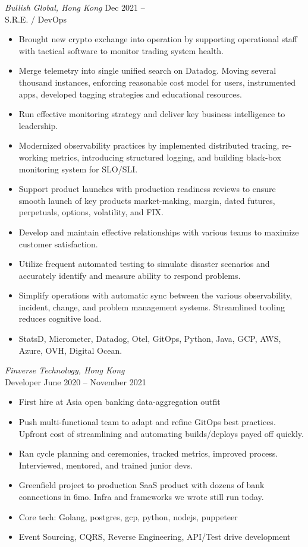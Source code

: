 \documentclass[10pt]{res} %
\begin{document}
\begin{resume}
\vspace{8pt} %

{\sl Bullish Global, Hong Kong} \hfill Dec 2021 --  \\
S.R.E. / DevOps \hfill 
\begin{itemize} \itemsep -2pt %
\item Brought new crypto exchange into operation by supporting operational staff with tactical software to monitor trading system health.
\item Merge telemetry into single unified search on Datadog. Moving several thousand instances, enforcing reasonable cost model for users, instrumented apps, developed tagging strategies and educational resources.
\item Run effective monitoring strategy and deliver key business intelligence to leadership.
\item Modernized observability practices by implemented distributed tracing, re-working metrics, introducing structured logging, and building black-box monitoring system for SLO/SLI.
\item Support product launches with production readiness reviews to ensure smooth launch of key products market-making, margin, dated futures, perpetuals, options, volatility, and FIX. 
\item Develop and maintain effective relationships with various teams to maximize customer satisfaction.
\item Utilize frequent automated testing to simulate disaster scenarios and accurately identify and measure ability to respond problems.
\item Simplify operations with automatic sync between the various observability, incident, change, and problem management systems. Streamlined tooling reduces cognitive load.
\item StatsD, Micrometer, Datadog, Otel, GitOps, Python, Java, GCP, AWS, Azure, OVH, Digital Ocean.
\end{itemize}

{\sl Finverse Technology, Hong Kong} \\[2pt]
Developer \hfill June 2020 -- November 2021 
\begin{itemize} \itemsep -2pt %
\item First hire at Asia open banking data-aggregation outfit
\item Push multi-functional team to adapt and refine GitOps best practices. Upfront cost of streamlining and automating builds/deploys payed off quickly.
\item Ran cycle planning and ceremonies, tracked metrics, improved process. Interviewed, mentored, and  trained junior devs.
\item Greenfield project to production SaaS product with dozens of bank connections in 6mo. Infra and frameworks we wrote still run today.
\item Core tech: Golang, postgres, gcp, python, nodejs, puppeteer
\item Event Sourcing, CQRS, Reverse Engineering, API/Test drive development
\end{itemize} 


\end{resume}
\end{document}
